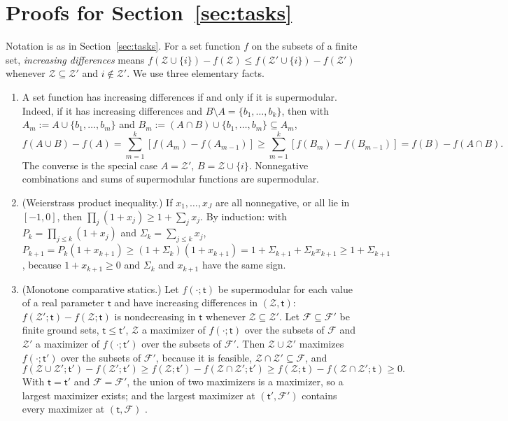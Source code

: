 \section{Proofs for Section~\ref{sec:tasks}}\label{app:proofs-tasks}

Notation is as in Section~\ref{sec:tasks}. For a set function $f$ on the subsets of a finite set, \emph{increasing differences} means $f(\mathcal Z\cup\{i\})-f(\mathcal Z)\le f(\mathcal Z'\cup\{i\})-f(\mathcal Z')$ whenever $\mathcal Z\subseteq\mathcal Z'$ and $i\notin\mathcal Z'$. We use three elementary facts.

\begin{enumerate}
\item[(T1)] A set function has increasing differences if and only if it is supermodular. Indeed, if it has increasing differences and $B\setminus A=\{b_1,\dots,b_k\}$, then with $A_m:=A\cup\{b_1,\dots,b_m\}$ and $B_m:=(A\cap B)\cup\{b_1,\dots,b_m\}\subseteq A_m$,
\[
f(A\cup B)-f(A)=\sum_{m=1}^k[f(A_m)-f(A_{m-1})]\ge\sum_{m=1}^k[f(B_m)-f(B_{m-1})]=f(B)-f(A\cap B).
\]
The converse is the special case $A=\mathcal Z'$, $B=\mathcal Z\cup\{i\}$. Nonnegative combinations and sums of supermodular functions are supermodular.
\item[(T2)] (Weierstrass product inequality.) If $x_1,\dots,x_J$ are all nonnegative, or all lie in $[-1,0]$, then $\prod_j(1+x_j)\ge 1+\sum_jx_j$. By induction: with $P_k=\prod_{j\le k}(1+x_j)$ and $\Sigma_k=\sum_{j\le k}x_j$, $P_{k+1}=P_k(1+x_{k+1})\ge(1+\Sigma_k)(1+x_{k+1})=1+\Sigma_{k+1}+\Sigma_kx_{k+1}\ge 1+\Sigma_{k+1}$, because $1+x_{k+1}\ge 0$ and $\Sigma_k$ and $x_{k+1}$ have the same sign.
\item[(T3)] (Monotone comparative statics.) Let $f(\cdot;\mathsf t)$ be supermodular for each value of a real parameter $\mathsf t$ and have increasing differences in $(\mathcal Z,\mathsf t)$: $f(\mathcal Z';\mathsf t)-f(\mathcal Z;\mathsf t)$ is nondecreasing in $\mathsf t$ whenever $\mathcal Z\subseteq\mathcal Z'$. Let $\mathcal F\subseteq\mathcal F'$ be finite ground sets, $\mathsf t\le\mathsf t'$, $\mathcal Z$ a maximizer of $f(\cdot;\mathsf t)$ over the subsets of $\mathcal F$ and $\mathcal Z'$ a maximizer of $f(\cdot;\mathsf t')$ over the subsets of $\mathcal F'$. Then $\mathcal Z\cup\mathcal Z'$ maximizes $f(\cdot;\mathsf t')$ over the subsets of $\mathcal F'$, because it is feasible, $\mathcal Z\cap\mathcal Z'\subseteq\mathcal F$, and
\[
f(\mathcal Z\cup\mathcal Z';\mathsf t')-f(\mathcal Z';\mathsf t')\ge f(\mathcal Z;\mathsf t')-f(\mathcal Z\cap\mathcal Z';\mathsf t')\ge f(\mathcal Z;\mathsf t)-f(\mathcal Z\cap\mathcal Z';\mathsf t)\ge 0 .
\]
With $\mathsf t=\mathsf t'$ and $\mathcal F=\mathcal F'$, the union of two maximizers is a maximizer, so a largest maximizer exists; and the largest maximizer at $(\mathsf t',\mathcal F')$ contains every maximizer at $(\mathsf t,\mathcal F)$ \citep{topkis1998supermodularity,milgrom1994monotone}.
\end{enumerate}


